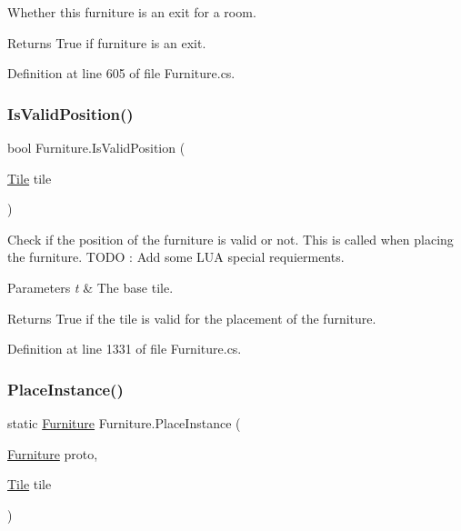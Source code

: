 Whether this furniture is an exit for a room. 

\begin{DoxyReturn}{Returns}
True if furniture is an exit.
\end{DoxyReturn}


Definition at line 605 of file Furniture.\+cs.

\mbox{\label{class_furniture_a290abe92f7472bfdf3dc1f0096e29e0b}} 
\subsubsection{\texorpdfstring{Is\+Valid\+Position()}{IsValidPosition()}}
{\footnotesize\ttfamily bool Furniture.\+Is\+Valid\+Position (\begin{DoxyParamCaption}\item[{\hyperlink{class_tile}{Tile}}]{tile }\end{DoxyParamCaption})}



Check if the position of the furniture is valid or not. This is called when placing the furniture. T\+O\+DO \+: Add some L\+UA special requierments. 


\begin{DoxyParams}{Parameters}
{\em t} & The base tile.\\
\hline
\end{DoxyParams}
\begin{DoxyReturn}{Returns}
True if the tile is valid for the placement of the furniture.
\end{DoxyReturn}


Definition at line 1331 of file Furniture.\+cs.

\mbox{\label{class_furniture_acc8b4bbcae6465985d9a4904cc6cc94e}} 
\subsubsection{\texorpdfstring{Place\+Instance()}{PlaceInstance()}}
{\footnotesize\ttfamily static \hyperlink{class_furniture}{Furniture} Furniture.\+Place\+Instance (\begin{DoxyParamCaption}\item[{\hyperlink{class_furniture}{Furniture}}]{proto,  }\item[{\hyperlink{class_tile}{Tile}}]{tile }\end{DoxyParamCaption})\hspace{0.3cm}{\ttfamily [static]}}



